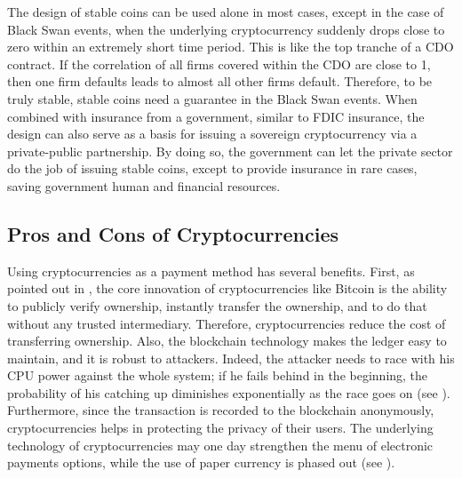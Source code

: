 \documentclass[final,pdftex]{ectaart}
\theoremstyle{plain}
\begin{document}
The design of stable coins can be used alone in most cases, except in the case of Black Swan events, when the underlying cryptocurrency suddenly drops close to zero within an extremely short time period. This is like the top tranche of a CDO contract. If the correlation of all firms covered within the CDO are close to 1, then one firm defaults leads to almost all other firms default. Therefore, to be truly stable, stable coins need a guarantee in the Black Swan events. When combined with insurance from a government, similar to FDIC insurance, the design can also serve as a basis for issuing a sovereign cryptocurrency via a private-public partnership. By doing so, the government can let the private sector do the job of issuing stable coins, except to provide insurance in rare cases, saving government human and financial resources.


\subsection{Pros and Cons of Cryptocurrencies}

Using cryptocurrencies as a payment method has several benefits. First, as pointed out in \cite{harvey_cryptofinance_2016}, the core innovation of cryptocurrencies like Bitcoin is the ability to publicly verify ownership, instantly transfer the ownership, and to do that without any trusted intermediary. Therefore, cryptocurrencies reduce the cost of transferring ownership. Also, the blockchain technology makes the ledger easy to maintain, and it is robust to attackers. Indeed, the attacker needs to race with his CPU power against the whole system; if he fails behind in the beginning, the probability of his catching up diminishes exponentially as the race goes on (see \cite{nakamoto_bitcoin:_2008}). Furthermore, since the transaction is recorded to the blockchain anonymously, cryptocurrencies helps in protecting the privacy of their users. The underlying technology of cryptocurrencies may one day strengthen the menu of electronic payments options, while the use of paper currency is phased out (see \cite{rogoff_costs_2015}).
\end{document}

